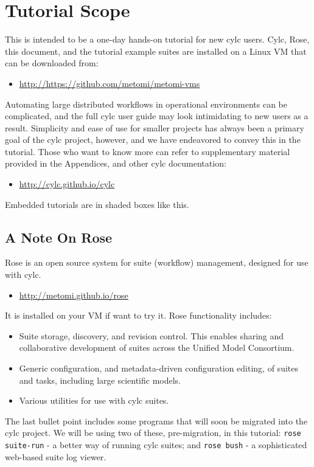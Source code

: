 \section{Tutorial Scope}

This is intended to be a one-day hands-on tutorial for new cylc users.  Cylc,
Rose, this document, and the tutorial example suites are installed on a
Linux VM that can be downloaded from:
\begin{itemize}
    \item \url{http://https://github.com/metomi/metomi-vms}
\end{itemize}

Automating large distributed workflows in operational environments can be
complicated, and the full cylc user guide may look intimidating to new users as
a result.  Simplicity and ease of use for smaller projects has always been a
primary goal of the cylc project, however, and we have endeavored to convey
this in the tutorial. Those who want to know more can refer to supplementary
material provided in the Appendices, and other cylc documentation:

\begin{itemize}
    \item \url{http://cylc.github.io/cylc}
\end{itemize}



\begin{shaded*}
Embedded tutorials are in shaded boxes like this.
\end{shaded*}

\subsection{A Note On Rose}

Rose is an open source system for suite (workflow) management, designed for use
with cylc.
\begin{itemize}
     \item \url{http://metomi.github.io/rose}
\end{itemize}
 
It is installed on your VM if want to try it.  Rose functionality
includes:
\begin{itemize}
    \item Suite storage, discovery, and revision control.  This enables sharing
        and collaborative development of suites across the Unified Model
        Consortium.
    \item Generic configuration, and metadata-driven configuration editing, of
        suites and tasks, including large scientific models.
    \item Various utilities for use with cylc suites.
\end{itemize}

The last bullet point includes some programs that will soon be migrated into
the cylc project.  We will be using two of these, pre-migration, in this
tutorial: \lstinline{rose suite-run} - a better way of running cylc suites; and
\lstinline{rose bush} - a sophisticated web-based suite log viewer.
